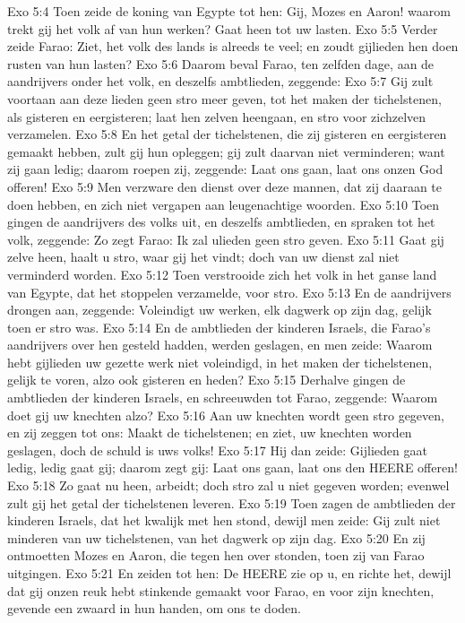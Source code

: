 Exo 5:4  Toen zeide de koning van Egypte tot hen: Gij, Mozes en Aaron! waarom trekt gij het volk af van hun werken? Gaat heen tot uw lasten.
Exo 5:5  Verder zeide Farao: Ziet, het volk des lands is alreeds te veel; en zoudt gijlieden hen doen rusten van hun lasten?
Exo 5:6  Daarom beval Farao, ten zelfden dage, aan de aandrijvers onder het volk, en deszelfs ambtlieden, zeggende:
Exo 5:7  Gij zult voortaan aan deze lieden geen stro meer geven, tot het maken der tichelstenen, als gisteren en eergisteren; laat hen zelven heengaan, en stro voor zichzelven verzamelen.
Exo 5:8  En het getal der tichelstenen, die zij gisteren en eergisteren gemaakt hebben, zult gij hun opleggen; gij zult daarvan niet verminderen; want zij gaan ledig; daarom roepen zij, zeggende: Laat ons gaan, laat ons onzen God offeren!
Exo 5:9  Men verzware den dienst over deze mannen, dat zij daaraan te doen hebben, en zich niet vergapen aan leugenachtige woorden.
Exo 5:10  Toen gingen de aandrijvers des volks uit, en deszelfs ambtlieden, en spraken tot het volk, zeggende: Zo zegt Farao: Ik zal ulieden geen stro geven.
Exo 5:11  Gaat gij zelve heen, haalt u stro, waar gij het vindt; doch van uw dienst zal niet verminderd worden.
Exo 5:12  Toen verstrooide zich het volk in het ganse land van Egypte, dat het stoppelen verzamelde, voor stro.
Exo 5:13  En de aandrijvers drongen aan, zeggende: Voleindigt uw werken, elk dagwerk op zijn dag, gelijk toen er stro was.
Exo 5:14  En de ambtlieden der kinderen Israels, die Farao's aandrijvers over hen gesteld hadden, werden geslagen, en men zeide: Waarom hebt gijlieden uw gezette werk niet voleindigd, in het maken der tichelstenen, gelijk te voren, alzo ook gisteren en heden?
Exo 5:15  Derhalve gingen de ambtlieden der kinderen Israels, en schreeuwden tot Farao, zeggende: Waarom doet gij uw knechten alzo?
Exo 5:16  Aan uw knechten wordt geen stro gegeven, en zij zeggen tot ons: Maakt de tichelstenen; en ziet, uw knechten worden geslagen, doch de schuld is uws volks!
Exo 5:17  Hij dan zeide: Gijlieden gaat ledig, ledig gaat gij; daarom zegt gij: Laat ons gaan, laat ons den HEERE offeren!
Exo 5:18  Zo gaat nu heen, arbeidt; doch stro zal u niet gegeven worden; evenwel zult gij het getal der tichelstenen leveren.
Exo 5:19  Toen zagen de ambtlieden der kinderen Israels, dat het kwalijk met hen stond, dewijl men zeide: Gij zult niet minderen van uw tichelstenen, van het dagwerk op zijn dag.
Exo 5:20  En zij ontmoetten Mozes en Aaron, die tegen hen over stonden, toen zij van Farao uitgingen.
Exo 5:21  En zeiden tot hen: De HEERE zie op u, en richte het, dewijl dat gij onzen reuk hebt stinkende gemaakt voor Farao, en voor zijn knechten, gevende een zwaard in hun handen, om ons te doden.
